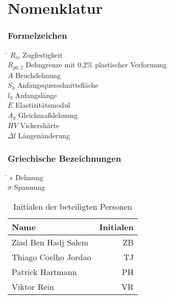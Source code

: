 \chapter*{Nomenklatur}



\subsection*{Formelzeichen}
\begin{tabbing}
	\hspace*{2cm}\=\kill
	$R_m$ \> Zugfestigkeit \\[0.2ex]
	$R_{p0,2}$ \> Dehngrenze mit 0,2\% plastischer Verformung \\[0.2ex]
	$A$ \> Bruchdehnung \\[0.2ex]
	$S_0$ \> Anfangsquerschnittsfläche \\[0.2ex]
	$l_0$ \> Anfangslänge \\[0.2ex]
	$E$ \> Elastizitätsmodul \\[0.2ex]
	$A_g$ \> Gleichmaßdehnung \\[0.2ex]
	$HV$ \> Vickershärte \\[0.2ex]
	$\Delta l$ \> Längenänderung \\[0.2ex]
	
\end{tabbing}

\subsection*{Griechische Bezeichnungen}
\begin{tabbing}
		\hspace*{2cm}\=\kill
	$\epsilon$ \> Dehnung \\[0.2ex]
	$\sigma$ \> Spannung \\[0.2ex]
	
\end{tabbing}




\begin{table}[] 
	\centering 
	\begin{tabular}{lr} 
		
		Name & \hspace{0.5cm} Initialen\\ 
		\hline 
		Ziad Ben Hadj Salem & ZB\\
		Thiago Coelho Jordao & TJ\\
		Patrick Hartmann & PH\\
		Viktor Rein & VR\\
		\hline
		
	\end{tabular} 
	\caption{Initialen der beteiligten Personen} 
	\label{tab:initialien} 
\end{table} 

